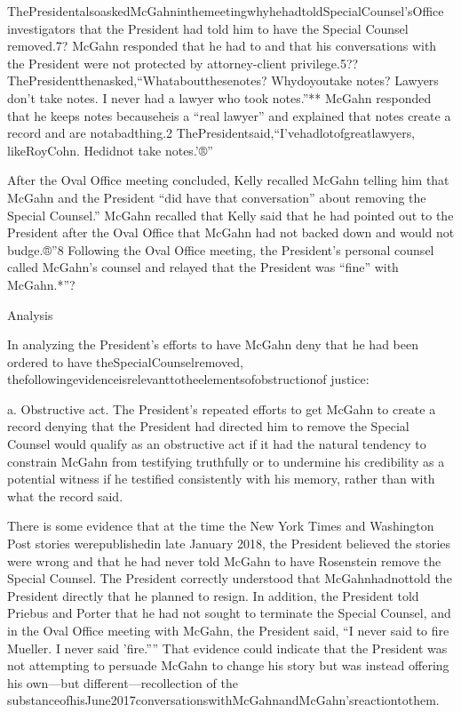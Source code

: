 ThePresidentalsoaskedMcGahninthemeetingwhyhehadtoldSpecialCounsel'sOffice investigators that the President had told him to have the Special Counsel removed.7?
McGahn responded that he had to and that his conversations with the President were not protected by attorney-client privilege.5??
ThePresidentthenasked,“Whataboutthesenotes? Whydoyoutake notes? Lawyers don't take notes.
I never had a lawyer who took notes.”**
McGahn responded that he keeps notes becauseheis a “real lawyer” and explained that notes create a record and are notabadthing.2
ThePresidentsaid,“I'vehadlotofgreatlawyers, likeRoyCohn.
Hedidnot take notes.'®”

After the Oval Office meeting concluded, Kelly recalled McGahn telling him that McGahn and the President “did have that conversation” about removing the Special Counsel.”
McGahn recalled that Kelly said that he had pointed out to the President after the Oval Office that McGahn had not backed down and would not budge.®”8
Following the Oval Office meeting, the President's personal counsel called McGahn's counsel and relayed that the President was “fine” with McGahn.*”?

Analysis

In analyzing the President's efforts to have McGahn deny that he had been ordered to have theSpecialCounselremoved, thefollowingevidenceisrelevanttotheelementsofobstructionof
justice:

a. Obstructive act.
The President's repeated efforts to get McGahn to create a record denying that the President had directed him to remove the Special Counsel would qualify as an obstructive act if it had the natural tendency to constrain McGahn from testifying truthfully or to undermine his credibility as a potential witness if he testified consistently with his memory, rather than with what the record said.

There is some evidence that at the time the New York Times and Washington Post stories werepublishedin late January 2018, the President believed the stories were wrong and that he had never told McGahn to have Rosenstein remove the Special Counsel.
The President correctly understood that McGahnhadnottold the President directly that he planned to resign.
In addition, the President told Priebus and Porter that he had not sought to terminate the Special Counsel, and in the Oval Office meeting with McGahn, the President said, “I never said to fire Mueller.
I never said 'fire.””
That evidence could indicate that the President was not attempting to persuade McGahn to change his story but was instead offering his own—but different—recollection of the substanceofhisJune2017conversationswithMcGahnandMcGahn'sreactiontothem.

